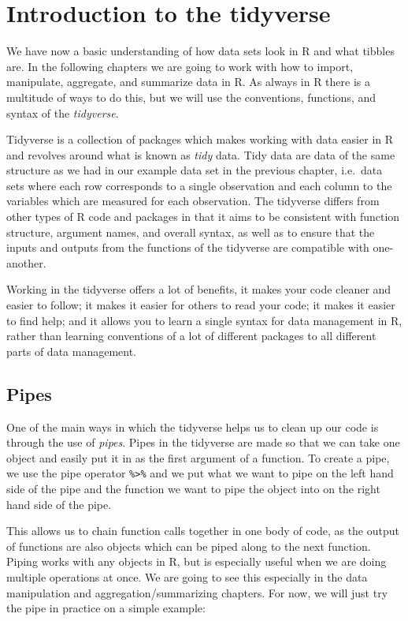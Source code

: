 \documentclass[
]{book}
\begin{document}
\hypertarget{introduction-to-the-tidyverse}{%
\chapter{Introduction to the tidyverse}\label{introduction-to-the-tidyverse}}

We have now a basic understanding of how data sets look in R and what tibbles are. In the following chapters we are going to work with how to import, manipulate, aggregate, and summarize data in R. As always in R there is a multitude of ways to do this, but we will use the conventions, functions, and syntax of the \emph{tidyverse}.

Tidyverse is a collection of packages which makes working with data easier in R and revolves around what is known as \emph{tidy} data. Tidy data are data of the same structure as we had in our example data set in the previous chapter, i.e.~data sets where each row corresponds to a single observation and each column to the variables which are measured for each observation. The tidyverse differs from other types of R code and packages in that it aims to be consistent with function structure, argument names, and overall syntax, as well as to ensure that the inputs and outputs from the functions of the tidyverse are compatible with one-another.

Working in the tidyverse offers a lot of benefits, it makes your code cleaner and easier to follow; it makes it easier for others to read your code; it makes it easier to find help; and it allows you to learn a single syntax for data management in R, rather than learning conventions of a lot of different packages to all different parts of data management.

\hypertarget{pipes}{%
\section{Pipes}\label{pipes}}

One of the main ways in which the tidyverse helps us to clean up our code is through the use of \emph{pipes}. Pipes in the tidyverse are made so that we can take one object and easily put it in as the first argument of a function. To create a pipe, we use the pipe operator \texttt{\%\textgreater{}\%} and we put what we want to pipe on the left hand side of the pipe and the function we want to pipe the object into on the right hand side of the pipe.

This allows us to chain function calls together in one body of code, as the output of functions are also objects which can be piped along to the next function. Piping works with any objects in R, but is especially useful when we are doing multiple operations at once. We are going to see this especially in the data manipulation and aggregation/summarizing chapters. For now, we will just try the pipe in practice on a simple example:
\end{document}
